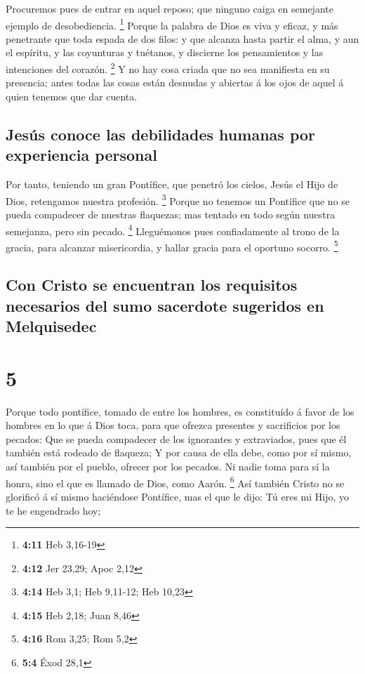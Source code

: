  Procuremos pues de entrar en aquel reposo; que ninguno
caiga en semejante ejemplo de desobediencia. \footnote{\textbf{4:11} Heb
  3,16-19}  Porque la palabra de Dios es viva y eficaz, y
más penetrante que toda espada de dos filos: y que alcanza hasta partir
el alma, y aun el espíritu, y las coyunturas y tuétanos, y discierne los
pensamientos y las intenciones del corazón. \footnote{\textbf{4:12} Jer
  23,29; Apoc 2,12}  Y no hay cosa criada que no sea
manifiesta en su presencia; antes todas las cosas están desnudas y
abiertas á los ojos de aquel á quien tenemos que dar cuenta.

\hypertarget{jesuxfas-conoce-las-debilidades-humanas-por-experiencia-personal}{%
\subsection{Jesús conoce las debilidades humanas por experiencia
personal}\label{jesuxfas-conoce-las-debilidades-humanas-por-experiencia-personal}}

 Por tanto, teniendo un gran Pontífice, que penetró los
cielos, Jesús el Hijo de Dios, retengamos nuestra profesión. \footnote{\textbf{4:14}
  Heb 3,1; Heb 9,11-12; Heb 10,23}  Porque no tenemos un
Pontífice que no se pueda compadecer de nuestras flaquezas; mas tentado
en todo según nuestra semejanza, pero sin pecado. \footnote{\textbf{4:15}
  Heb 2,18; Juan 8,46}  Lleguémonos pues confiadamente al
trono de la gracia, para alcanzar misericordia, y hallar gracia para el
oportuno socorro. \footnote{\textbf{4:16} Rom 3,25; Rom 5,2}

\hypertarget{con-cristo-se-encuentran-los-requisitos-necesarios-del-sumo-sacerdote-sugeridos-en-melquisedec}{%
\subsection{Con Cristo se encuentran los requisitos necesarios del sumo
sacerdote sugeridos en
Melquisedec}\label{con-cristo-se-encuentran-los-requisitos-necesarios-del-sumo-sacerdote-sugeridos-en-melquisedec}}

\hypertarget{section-4}{%
\section{5}\label{section-4}}

 Porque todo pontífice, tomado de entre los hombres, es
constituído á favor de los hombres en lo que á Dios toca, para que
ofrezca presentes y sacrificios por los pecados:  Que se
pueda compadecer de los ignorantes y extraviados, pues que él también
está rodeado de flaqueza;  Y por causa de ella debe, como
por sí mismo, así también por el pueblo, ofrecer por los pecados.
 Ni nadie toma para sí la honra, sino el que es llamado de
Dios, como Aarón. \footnote{\textbf{5:4} Éxod 28,1}  Así
también Cristo no se glorificó á sí mismo haciéndose Pontífice, mas el
que le dijo: Tú eres mi Hijo, yo te he engendrado hoy;

